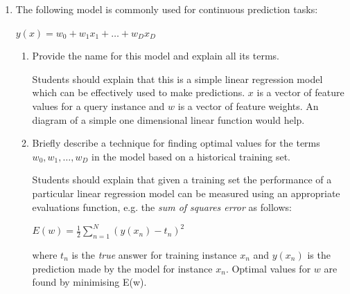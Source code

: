 \documentclass[solution]{ditpaper}
\begin{document}
\question 
	\begin{enumerate}
		\item The following model is commonly used for continuous prediction tasks:

\begin{center}
$y(x)=w_0 + w_1x_1 + \dots + w_Dx_D$
\end{center}

\begin{enumerate}
\item Provide the name for this model and explain all its terms.


		\begin{answer}
		Students should explain that this is a simple linear regression model which can be effectively used to make predictions. $x$ is a vector of feature values for a query instance and $w$ is a vector of feature weights. An diagram of a simple one dimensional linear function would help.
		\end{answer}
		
\item Briefly describe a technique for finding optimal values for the terms\\ $w_0, w_1, \dots , w_D$ in the model based on a historical training set.

		\begin{answer}
		
		Students should explain that given a training set the performance of a particular linear regression model can be measured using an appropriate evaluations function, e.g. the \emph{sum of squares error} as follows:
		
		\begin{center}
		$E(w)=\frac{1}{2}\sum_{n=1}^{N}(y(x_n)-t_n)^2$
		\end{center}
				
		where $t_n$ is the \emph{true} answer for training instance $x_n$ and $y(x_n)$ is the prediction made by the model for instance $x_n$. Optimal values for $w$ are found by minimising E(w).
		\end{answer}
\end{enumerate}
		

\end{enumerate}
\end{document}
